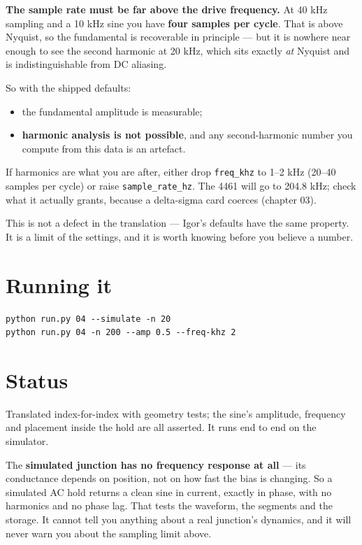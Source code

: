 \textbf{The sample rate must be far above the drive frequency.} At 40 kHz sampling and a 10 kHz sine you have \textbf{four samples per cycle}. That is above Nyquist, so the fundamental is recoverable in principle --- but it is nowhere near enough to see the second harmonic at 20 kHz, which sits exactly \emph{at} Nyquist and is indistinguishable from DC aliasing.

So with the shipped defaults:

\begin{itemize}[leftmargin=*]
\item the fundamental amplitude is measurable;
\item \textbf{harmonic analysis is not possible}, and any second-harmonic number you compute from this data is an artefact.
\end{itemize}

If harmonics are what you are after, either drop \texttt{freq\_\discretionary{}{}{}khz} to 1--2 kHz (20--40 samples per cycle) or raise \texttt{sample\_\discretionary{}{}{}rate\_\discretionary{}{}{}hz}. The 4461 will go to 204.8 kHz; check what it actually grants, because a delta-sigma card coerces (chapter 03).

This is not a defect in the translation --- Igor's defaults have the same property. It is a limit of the settings, and it is worth knowing before you believe a number.

\section{Running it}

\begin{lstlisting}[style=out]
python run.py 04 --simulate -n 20
python run.py 04 -n 200 --amp 0.5 --freq-khz 2
\end{lstlisting}

\section{Status}

Translated index-for-index with geometry tests; the sine's amplitude, frequency and placement inside the hold are all asserted. It runs end to end on the simulator.

The \textbf{simulated junction has no frequency response at all} --- its conductance depends on position, not on how fast the bias is changing. So a simulated AC hold returns a clean sine in current, exactly in phase, with no harmonics and no phase lag. That tests the waveform, the segments and the storage. It cannot tell you anything about a real junction's dynamics, and it will never warn you about the sampling limit above.


